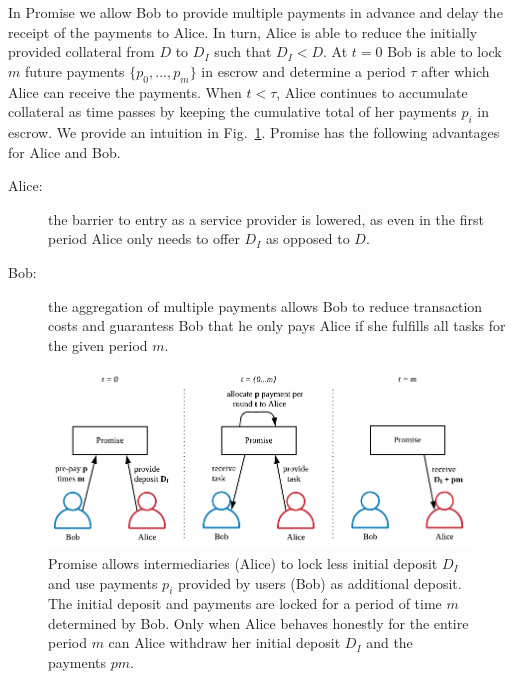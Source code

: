 \documentclass[runningheads]{llncs}
\newcommand{\sys}{Promise\xspace}
\begin{document}
In \sys we allow Bob to provide multiple payments in advance and delay the receipt of the payments to Alice.
In turn, Alice is able to reduce the initially provided collateral from $D$ to $D_I$ such that $D_I < D$.
At $t=0$ Bob is able to lock $m$ future payments $\{p_0, ..., p_m\}$ in escrow and determine a period $\tau$ after which Alice can receive the payments.
When $t < \tau$, Alice continues to accumulate collateral as time passes by keeping the cumulative total of her payments $p_i$ in escrow. 
We provide an intuition in Fig.~\ref{fig:promise}.
\sys has the following advantages for Alice and Bob. 

\begin{description}
    \item[Alice:] the barrier to entry as a service provider is lowered, as even in the first period Alice only needs to offer $D_I$ as opposed to $D$.
    \item[Bob:] the aggregation of multiple payments allows Bob to reduce transaction costs and guarantess Bob that he only pays Alice if she fulfills all tasks for the given period $m$.
\end{description}

\begin{figure}[t!]
    \centering
    \includegraphics[width=\textwidth]{promise/figures/protocol.pdf}
    \caption{\sys allows intermediaries (Alice) to lock less initial deposit $D_I$ and use payments $p_i$ provided by users (Bob) as additional deposit. The initial deposit and payments are locked for a period of time $m$ determined by Bob. Only when Alice behaves honestly for the entire period $m$ can Alice withdraw her initial deposit $D_I$ and the payments $pm$.}
    \label{fig:promise}
\end{figure}
\end{document}
